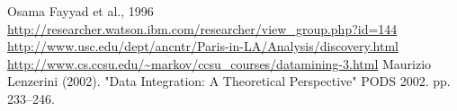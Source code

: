\documentclass[
12pt, %
english, %
singlespacing, %
headsepline, %
]{MastersDoctoralThesis} %
\begin{document}

%
%


\printbibliography[heading=bibintoc]

\begin{thebibliography}{2}
Osama Fayyad et al., 1996
\url{http://researcher.watson.ibm.com/researcher/view_group.php?id=144}
\url{http://www.usc.edu/dept/ancntr/Paris-in-LA/Analysis/discovery.html}
\url{http://www.cs.ccsu.edu/~markov/ccsu_courses/datamining-3.html}
Maurizio Lenzerini (2002). "Data Integration: A Theoretical Perspective" PODS 2002. pp. 233–246.
\end{thebibliography} 


\end{document}

